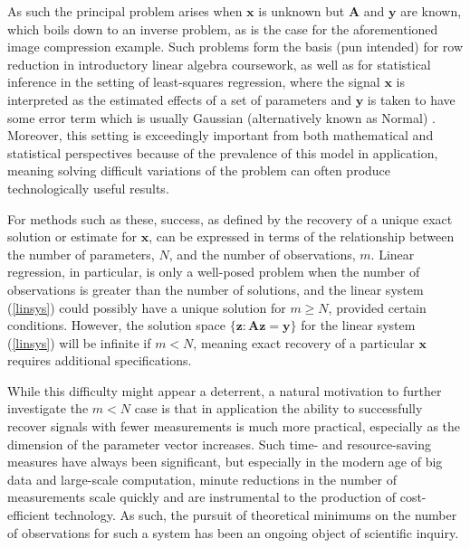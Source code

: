 \documentclass[12pt,a4paper]{amsart}
\numberwithin{equation}{section}
\theoremstyle{plain}
\theoremstyle{definition}
\newcommand{\bdy}{\mathbf{y}}
\newcommand{\bdx}{\mathbf{x}}
\newcommand{\bdz}{\mathbf{z}}
\newcommand{\bdA}{\mathbf{A}}
\begin{document}
As such the principal problem arises when $\bdx$ is unknown but $\bdA$ and $\bdy$ are known, which boils down to an inverse problem, as is the case for the aforementioned image compression example. Such problems form the basis (pun intended) for row reduction in introductory linear algebra coursework, as well as for statistical inference in the setting of least-squares regression, where the signal $\bdx$ is interpreted as the estimated effects of a set of parameters and $\bdy$ is taken to have some error term which is usually Gaussian (alternatively known as Normal) \cite{agresti}. Moreover, this setting is exceedingly important from both mathematical and statistical perspectives because of the prevalence of this model in application, meaning solving difficult variations of the problem can often produce technologically useful results.

For methods such as these, success, as defined by the recovery of a unique exact solution or estimate for $\bdx$, can be expressed in terms of the relationship between the number of parameters, $N$, and the number of observations, $m$. Linear regression, in particular, is only a well-posed problem when the number of observations is greater than the number of solutions, and the linear system (\ref{linsys}) could possibly have a unique solution for $m\geq N$, provided certain conditions. However, the solution space $\{\bdz:\bdA\bdz=\bdy\}$ for the linear system (\ref{linsys}) will be infinite if $m<N$, meaning exact recovery of a particular $\bdx$ requires additional specifications. 

While this difficulty might appear a deterrent, a natural motivation to further investigate the $m<N$ case is that in application the ability to successfully recover signals with fewer measurements is much more practical, especially as the dimension of the parameter vector increases. Such time- and resource-saving measures have always been significant, but especially in the modern age of big data and large-scale computation, minute reductions in the number of measurements scale quickly and are instrumental to the production of cost-efficient technology. As such, the pursuit of theoretical minimums on the number of observations for such a system has been an ongoing object of scientific inquiry.
\end{document}
